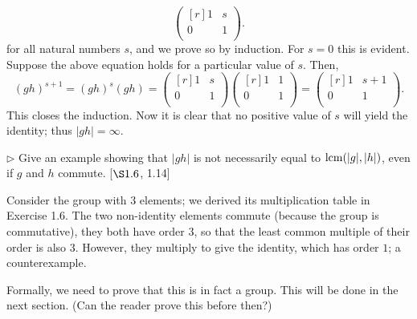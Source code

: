 \begin{solution}
\[\begin{pmatrix*}[r]
			1 & s\\
			0 & 1\\
		\end{pmatrix*}.
	\]
	for all natural numbers $s$, and we prove so by induction. For $s = 0$ this is evident. Suppose the above equation holds for a particular value of $s$. Then,
	\[
		(gh)^{s+1} =(gh)^s(gh)=  
		\begin{pmatrix*}[r]
			1 & s\\
			0 & 1\\
		\end{pmatrix*}
		\begin{pmatrix*}[r]
			1 & 1\\
			0 & 1\\
		\end{pmatrix*} =
		\begin{pmatrix*}[r]
			1 & s+1\\
			0 & 1\\
		\end{pmatrix*}.
	\]
	This closes the induction. Now it is clear that no positive value of $s$ will yield the identity; thus $|gh| = \infty$.
\end{solution}

\begin{exercise}
	$\triangleright$ Give an example showing that $|gh|$ is not necessarily equal to $\operatorname{lcm}(|g|,|h|)$, even if $g$ and $h$ commute. [$\S 1.6$, 1.14]
\end{exercise}
\begin{solution}
	Consider the group with 3 elements; we derived its multiplication table in Exercise 1.6. The two non-identity elements commute (because the group is commutative), they both have order 3, so that the least common multiple of their order is also 3. However, they multiply to give the identity, which has order $1$; a counterexample.
	
	Formally, we need to prove that this is in fact a group. This will be done in the next section. (Can the reader prove this before then?)
\end{solution}

